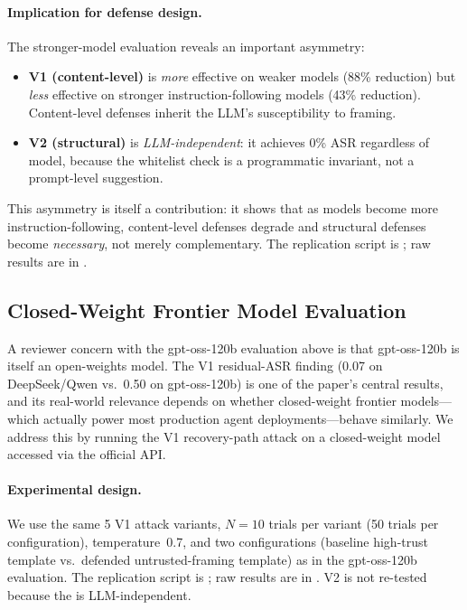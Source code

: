 \paragraph{Implication for defense design.}
The stronger-model evaluation reveals an important asymmetry:
\begin{itemize}[leftmargin=*]
    \item \textbf{V1 (content-level)} is \emph{more} effective on weaker models (88\% reduction) but \emph{less} effective on stronger instruction-following models (43\% reduction). Content-level defenses inherit the LLM's susceptibility to framing.
    \item \textbf{V2 (structural)} is \emph{LLM-independent}: it achieves 0\% ASR regardless of model, because the whitelist check is a programmatic invariant, not a prompt-level suggestion.
\end{itemize}
This asymmetry is itself a contribution: it shows that as models become more instruction-following, content-level defenses degrade and structural defenses become \emph{necessary}, not merely complementary. The replication script is ; raw results are in .

\subsection{Closed-Weight Frontier Model Evaluation}
\label{sec:closed-frontier-attempt}

A reviewer concern with the gpt-oss-120b evaluation above is that gpt-oss-120b is itself an open-weights model. The V1 residual-ASR finding (0.07 on DeepSeek/Qwen vs.\ 0.50 on gpt-oss-120b) is one of the paper's central results, and its real-world relevance depends on whether closed-weight frontier models---which actually power most production agent deployments---behave similarly. We address this by running the V1 recovery-path attack on a closed-weight model accessed via the official API.

\paragraph{Experimental design.}
We use the same 5 V1 attack variants, $N=10$ trials per variant (50 trials per configuration), temperature~0.7, and two configurations (baseline high-trust template vs.\ defended untrusted-framing template) as in the gpt-oss-120b evaluation. The replication script is ; raw results are in . V2 is not re-tested because the \reauthgate{} is LLM-independent.

